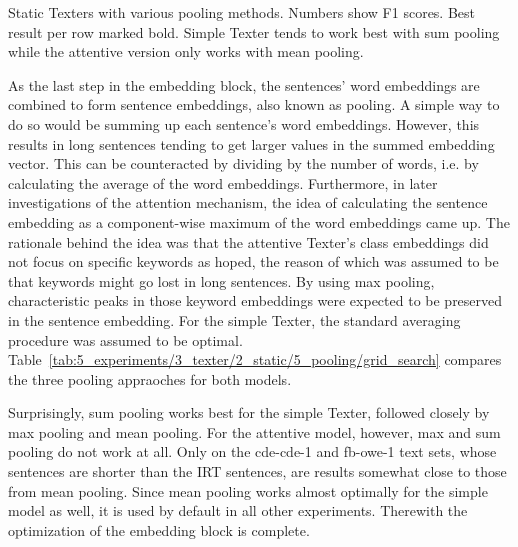\begin{table}[h]
    \centering
    
    \caption{Static Texters with various pooling methods. Numbers show F1 scores. Best result per row marked bold. Simple Texter tends to work best with sum pooling while the attentive version only works with mean pooling.}
    \label{tab:5_experiments/3_texter/2_static/5_pooling/grid_search}
\end{table}

As the last step in the embedding block, the sentences' word embeddings are combined to form sentence embeddings, also known as pooling. A simple way to do so would be summing up each sentence's word embeddings. However, this results in long sentences tending to get larger values in the summed embedding vector. This can be counteracted by dividing by the number of words, i.e. by calculating the average of the word embeddings. Furthermore, in later investigations of the attention mechanism, the idea of calculating the sentence embedding as a component-wise maximum of the word embeddings came up. The rationale behind the idea was that the attentive Texter's class embeddings did not focus on specific keywords as hoped, the reason of which was assumed to be that keywords might go lost in long sentences. By using max pooling, characteristic peaks in those keyword embeddings were expected to be preserved in the sentence embedding. For the simple Texter, the standard averaging procedure was assumed to be optimal. Table~\ref{tab:5_experiments/3_texter/2_static/5_pooling/grid_search} compares the three pooling appraoches for both models.

Surprisingly, sum pooling works best for the simple Texter, followed closely by max pooling and mean pooling. For the attentive model, however, max and sum pooling do not work at all. Only on the cde-cde-1 and fb-owe-1 text sets, whose sentences are shorter than the IRT sentences, are results somewhat close to those from mean pooling. Since mean pooling works almost optimally for the simple model as well, it is used by default in all other experiments. Therewith the optimization of the embedding block is complete.
